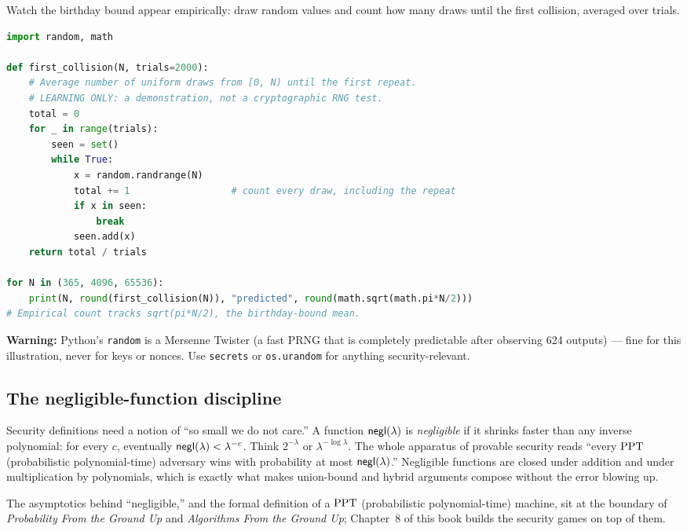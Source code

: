 \begin{implementbox}
Watch the birthday bound appear empirically: draw random values and count how many
draws until the first collision, averaged over trials.

\begin{lstlisting}[language=Python]
import random, math

def first_collision(N, trials=2000):
    # Average number of uniform draws from [0, N) until the first repeat.
    # LEARNING ONLY: a demonstration, not a cryptographic RNG test.
    total = 0
    for _ in range(trials):
        seen = set()
        while True:
            x = random.randrange(N)
            total += 1                  # count every draw, including the repeat
            if x in seen:
                break
            seen.add(x)
    return total / trials

for N in (365, 4096, 65536):
    print(N, round(first_collision(N)), "predicted", round(math.sqrt(math.pi*N/2)))
# Empirical count tracks sqrt(pi*N/2), the birthday-bound mean.
\end{lstlisting}
\textbf{Warning:} Python's \texttt{random} is a Mersenne Twister (a fast PRNG that is completely predictable after observing 624 outputs) --- fine for this
illustration, never for keys or nonces. Use \texttt{secrets} or
\texttt{os.urandom} for anything security-relevant.
\end{implementbox}

\subsection{The negligible-function discipline}
\label{ch41:negl}

Security definitions need a notion of ``so small we do not care.'' A function
$\mathsf{negl}(\lambda)$ is \emph{negligible} if it shrinks faster than any inverse
polynomial: for every $c$, eventually $\mathsf{negl}(\lambda) < \lambda^{-c}$. Think
$2^{-\lambda}$ or $\lambda^{-\log\lambda}$. The whole apparatus of provable
security reads ``every $\mathrm{PPT}$ (probabilistic polynomial-time) adversary wins with probability at most
$\mathsf{negl}(\lambda)$.'' Negligible functions are closed under addition and under
multiplication by polynomials, which is exactly what makes union-bound and hybrid
arguments compose without the error blowing up.

\begin{connectionbox}
The asymptotics behind ``negligible,'' and the formal definition of a $\mathrm{PPT}$
(probabilistic polynomial-time) machine, sit at the boundary of
\emph{Probability From the Ground Up} and \emph{Algorithms From the Ground Up};
Chapter~8 of this book builds the security games on top of
them.
\end{connectionbox}


